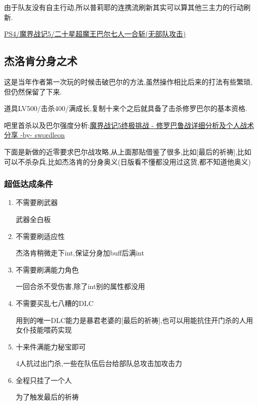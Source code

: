 	由于队友没有自主行动,所以普莉耶的连携流刷新其实可以算其他三主力的行动刷新.

	\href{http://www.bilibili.com/video/av3480159/}{ PS4/魔界战记5/二十星超魔王巴尔七人一合斩(无部队攻击)}

	\newpage

	\subsection{杰洛肯分身之术}

	这是当年作者第一次玩的时候击破巴尔的方法,虽然操作相比后来的打法有些繁琐,但仍然保留了下来.

	道具LV500/击杀400/满成长,复制十来个之后就具备了击杀修罗巴尔的基本资格.

	{\color{red}{如果准备了大概200个万灵药做的咖喱可以不需要装备就达到20亿血,简化辅助人员的需求}}

	吧里首杀以及巴尔强度分析:\href{http://tieba.baidu.com/p/3949061316}{魔界战记5终极挑战 - 修罗巴鲁战详细分析及个人战术分享 -by- swordleon }

	下面是新做的近零要求巴尔战攻略,从上面那贴借鉴了很多,比如[最后的祈祷],比如可以不杀杂兵,比如杰洛肯的分身奥义(日版看不懂都没用过这货,都不知道他奥义)

	\subsubsection{超低达成条件}
	\begin{enumerate}
		\item{不需要刷武器}
		
		武器全白板

		\item{不需要刷适应性}
		
		杰洛肯稍微走下int,保证分身加buff后满int

		\item{不需要刷满能力角色}
		
		一回合杀不受伤害,除了int别的属性都没用

		\item{不需要买乱七八糟的DLC}
		
		用到的唯一DLC能力是暴君老婆的[最后的祈祷],也可以用能抗住开门杀的人用女仆技能喂药实现

		\item{十来件满能力秘宝即可}
		
		4人抗过出门杀,一些在队伍后台给部队总攻击加攻击力

		\item{全程只挂了一个人}
		
		为了触发最后的祈祷
	\end{enumerate}


